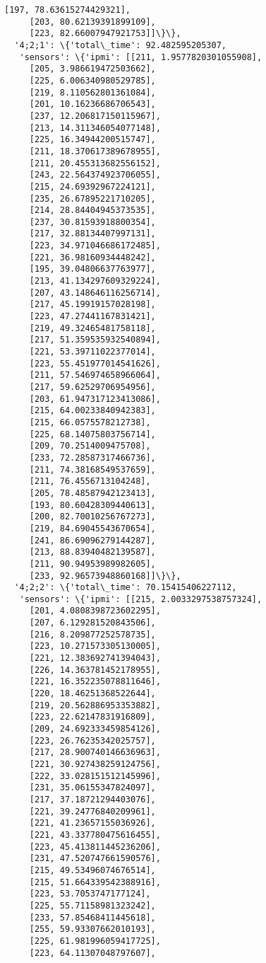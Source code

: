 \documentclass[11pt]{article}
\begin{document}
\begin{tcolorbox}[breakable, size=fbox, boxrule=.5pt, pad at break*=1mm, opacityfill=0]
\begin{Verbatim}[commandchars=\\\{\}]
     [197, 78.63615274429321],
     [203, 80.62139391899109],
     [223, 82.66007947921753]]\}\},
  '4;2;1': \{'total\_time': 92.482595205307,
   'sensors': \{'ipmi': [[211, 1.9577820301055908],
     [205, 3.986619472503662],
     [225, 6.006340980529785],
     [219, 8.110562801361084],
     [201, 10.16236686706543],
     [237, 12.206817150115967],
     [213, 14.311346054077148],
     [225, 16.34944200515747],
     [211, 18.370617389678955],
     [211, 20.455313682556152],
     [243, 22.564374923706055],
     [215, 24.69392967224121],
     [235, 26.67895221710205],
     [214, 28.84404945373535],
     [237, 30.81593918800354],
     [217, 32.88134407997131],
     [223, 34.971046686172485],
     [221, 36.98160934448242],
     [195, 39.04806637763977],
     [213, 41.134297609329224],
     [207, 43.148646116256714],
     [217, 45.19919157028198],
     [223, 47.27441167831421],
     [219, 49.32465481758118],
     [217, 51.359535932540894],
     [221, 53.39711022377014],
     [223, 55.451977014541626],
     [211, 57.546974658966064],
     [217, 59.62529706954956],
     [203, 61.947317123413086],
     [215, 64.00233840942383],
     [215, 66.0575578212738],
     [225, 68.14075803756714],
     [209, 70.2514009475708],
     [233, 72.28587317466736],
     [211, 74.38168549537659],
     [211, 76.4556713104248],
     [205, 78.48587942123413],
     [193, 80.60428309440613],
     [200, 82.70010256767273],
     [219, 84.69045543670654],
     [241, 86.69096279144287],
     [213, 88.83940482139587],
     [211, 90.94953989982605],
     [233, 92.96573948860168]]\}\},
  '4;2;2': \{'total\_time': 70.15415406227112,
   'sensors': \{'ipmi': [[215, 2.0033297538757324],
     [201, 4.0808398723602295],
     [207, 6.129281520843506],
     [216, 8.209877252578735],
     [223, 10.271573305130005],
     [221, 12.383692741394043],
     [226, 14.363781452178955],
     [221, 16.352235078811646],
     [220, 18.46251368522644],
     [219, 20.562886953353882],
     [223, 22.62147831916809],
     [209, 24.692333459854126],
     [223, 26.76235342025757],
     [217, 28.900740146636963],
     [221, 30.927438259124756],
     [222, 33.028151512145996],
     [231, 35.06155347824097],
     [217, 37.18721294403076],
     [221, 39.24776840209961],
     [221, 41.23657155036926],
     [221, 43.337780475616455],
     [223, 45.413811445236206],
     [231, 47.520747661590576],
     [215, 49.53496074676514],
     [215, 51.664339542388916],
     [223, 53.7053747177124],
     [225, 55.71158981323242],
     [233, 57.85468411445618],
     [255, 59.93307662010193],
     [225, 61.981996059417725],
     [223, 64.11307048797607],

\end{Verbatim}
\end{tcolorbox}
\end{document}

